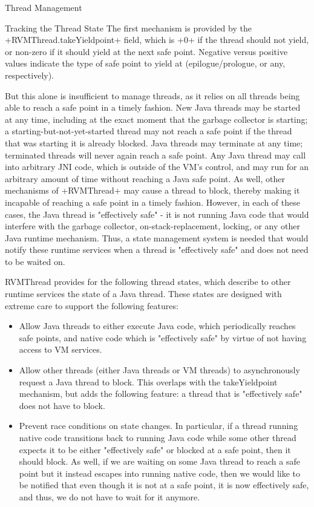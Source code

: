 \begin{section}{Thread Management}
\begin{subsection}{Tracking the Thread State}
The first mechanism is provided by the \spverb+RVMThread.takeYieldpoint+ field, which is \spverb+0+ if the thread should not yield, or non-zero if it should yield at the next safe point. Negative versus positive values indicate the type of safe point to yield at (epilogue/prologue, or any, respectively).

But this alone is insufficient to manage threads, as it relies on all threads being able to reach a safe point in a timely fashion. New Java threads may be started at any time, including at the exact moment that the garbage collector is starting; a starting-but-not-yet-started thread may not reach a safe point if the thread that was starting it is already blocked. Java threads may terminate at any time; terminated threads will never again reach a safe point. Any Java thread may call into arbitrary JNI code, which is outside of the VM's control, and may run for an arbitrary amount of time without reaching a Java safe point. As well, other mechanisms of \spverb+RVMThread+ may cause a thread to block, thereby making it incapable of reaching a safe point in a timely fashion. However, in each of these cases, the Java thread is "effectively safe" - it is not running Java code that would interfere with the garbage collector, on-stack-replacement, locking, or any other Java runtime mechanism. Thus, a state management system is needed that would notify these runtime services when a thread is "effectively safe" and does not need to be waited on.

RVMThread provides for the following thread states, which describe to other runtime services the state of a Java thread. These states are designed with extreme care to support the following features:
\begin{itemize}
  \item Allow Java threads to either execute Java code, which periodically reaches safe points, and native code which is "effectively safe" by virtue of not having access to VM services.
  \item Allow other threads (either Java threads or VM threads) to asynchronously request a Java thread to block. This overlaps with the takeYieldpoint mechanism, but adds the following feature: a thread that is "effectively safe" does not have to block.
  \item Prevent race conditions on state changes. In particular, if a thread running native code transitions back to running Java code while some other thread expects it to be either "effectively safe" or blocked at a safe point, then it should block. As well, if we are waiting on some Java thread to reach a safe point but it instead escapes into running native code, then we would like to be notified that even though it is not at a safe point, it is now effectively safe, and thus, we do not have to wait for it anymore.
\end{itemize}



\end{subsection}
\end{section}
